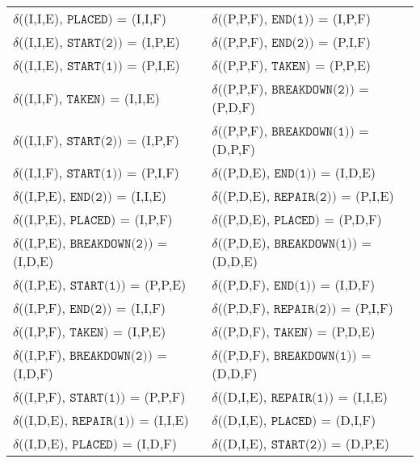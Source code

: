 \begin{table}\centering
  \begin{tabular}{ll}
    $\delta$((I,I,E), $\texttt{PLACED})$ = (I,I,F)       & $\delta$((P,P,F), $\texttt{END(1)})$ = (I,P,F)       \\
    $\delta$((I,I,E), $\texttt{START(2)})$ = (I,P,E)     & $\delta$((P,P,F), $\texttt{END(2)})$ = (P,I,F)       \\
    $\delta$((I,I,E), $\texttt{START(1)})$ = (P,I,E)     & $\delta$((P,P,F), $\texttt{TAKEN})$ = (P,P,E)        \\
    $\delta$((I,I,F), $\texttt{TAKEN})$ = (I,I,E)        & $\delta$((P,P,F), $\texttt{BREAKDOWN(2)})$ = (P,D,F) \\
    $\delta$((I,I,F), $\texttt{START(2)})$ = (I,P,F)     & $\delta$((P,P,F), $\texttt{BREAKDOWN(1)})$ = (D,P,F) \\
    $\delta$((I,I,F), $\texttt{START(1)})$ = (P,I,F)     & $\delta$((P,D,E), $\texttt{END(1)})$ = (I,D,E)       \\
    $\delta$((I,P,E), $\texttt{END(2)})$ = (I,I,E)       & $\delta$((P,D,E), $\texttt{REPAIR(2)})$ = (P,I,E)    \\
    $\delta$((I,P,E), $\texttt{PLACED})$ = (I,P,F)       & $\delta$((P,D,E), $\texttt{PLACED})$ = (P,D,F)       \\
    $\delta$((I,P,E), $\texttt{BREAKDOWN(2)})$ = (I,D,E) & $\delta$((P,D,E), $\texttt{BREAKDOWN(1)})$ = (D,D,E) \\
    $\delta$((I,P,E), $\texttt{START(1)})$ = (P,P,E)     & $\delta$((P,D,F), $\texttt{END(1)})$ = (I,D,F)       \\
    $\delta$((I,P,F), $\texttt{END(2)})$ = (I,I,F)       & $\delta$((P,D,F), $\texttt{REPAIR(2)})$ = (P,I,F)    \\
    $\delta$((I,P,F), $\texttt{TAKEN})$ = (I,P,E)        & $\delta$((P,D,F), $\texttt{TAKEN})$ = (P,D,E)         \\
    $\delta$((I,P,F), $\texttt{BREAKDOWN(2)})$ = (I,D,F) & $\delta$((P,D,F), $\texttt{BREAKDOWN(1)})$ = (D,D,F)  \\
    $\delta$((I,P,F), $\texttt{START(1)})$ = (P,P,F)     & $\delta$((D,I,E), $\texttt{REPAIR(1)})$ = (I,I,E)     \\
    $\delta$((I,D,E), $\texttt{REPAIR(1)})$ = (I,I,E)    & $\delta$((D,I,E), $\texttt{PLACED})$ = (D,I,F)        \\
    $\delta$((I,D,E), $\texttt{PLACED})$ = (I,D,F)       & $\delta$((D,I,E), $\texttt{START(2)})$ = (D,P,E)      \\

\end{tabular}
\end{table}

